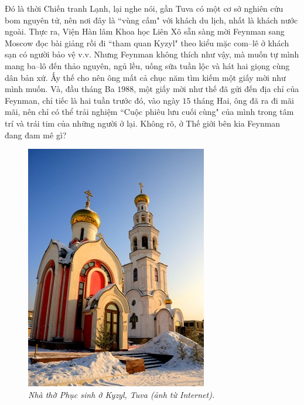 \begin{multicols}{2}
	Đó là thời Chiến tranh Lạnh, lại nghe nói, gần Tuva có một cơ sở nghiên cứu bom nguyên tử, nên nơi đây là ``vùng cấm" với khách du lịch, nhất là khách nước ngoài. Thực ra, Viện Hàn lâm Khoa học Liên Xô sẵn sàng mời Feynman sang Moscow  đọc bài giảng rồi đi ``tham quan Kyzyl" theo kiểu mặc com--lê ở khách sạn có người bảo vệ v.v. Nhưng Feynman không thích như vậy, mà muốn tự mình mang ba--lô đến thảo nguyên, ngủ lều, uống sữa tuần lộc và hát hai giọng cùng dân bản xứ. Ấy thế cho nên ông mất cả chục năm tìm kiếm một giấy mời như mình muốn. Và, đầu tháng Ba $1988$, một giấy mời như thế đã gửi đến địa chỉ của Feynman, chỉ tiếc là hai tuần trước đó, vào ngày $15$ tháng Hai, ông đã ra đi mãi mãi, nên chỉ có thể trải nghiệm ``Cuộc phiêu lưu cuối cùng" của mình trong tâm trí và trái tim của những người ở lại. Không rõ, ở Thế giới bên kia Feynman đang đam mê gì?
	\begin{figure}[H]
		\vspace*{-5pt}
		\centering
		\captionsetup{labelformat= empty, justification=centering}
		\includegraphics[width= 1\linewidth]{4a}
		\caption{\small\textit{\color{quantoan}Nhà thờ Phục sinh ở Kyzyl, Tuva (ảnh từ Internet).}}
		\vspace*{-5pt}
	\end{figure}
\end{multicols}